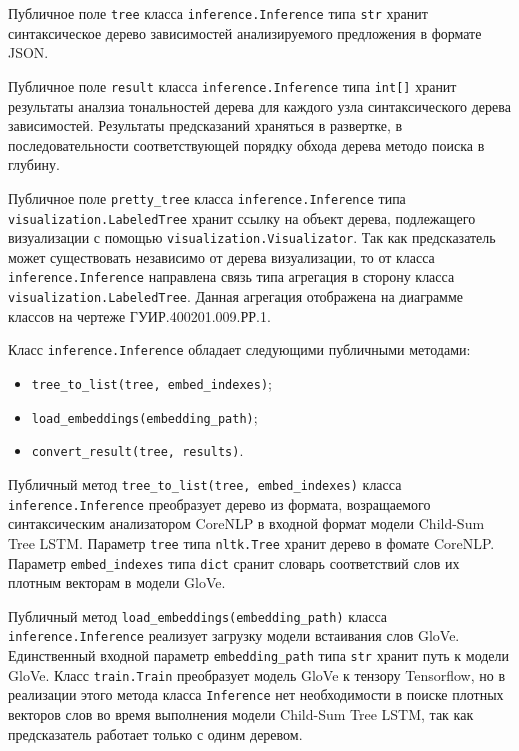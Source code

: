 Публичное поле \texttt{tree} класса \texttt{inference.Inference} типа \texttt{str} хранит синтаксическое дерево зависимостей анализируемого предложения в формате JSON\@.

Публичное поле \texttt{result} класса \texttt{inference.Inference} типа \texttt{int[]} хранит результаты аналзиа тональностей дерева для каждого узла синтаксического дерева зависимостей. Результаты предсказаний храняться в развертке, в последовательности соответствующей порядку обхода дерева методо поиска в глубину.

Публичное поле \texttt{pretty\_tree} класса \texttt{inference.Inference} типа \texttt{visu\-alization.LabeledTree} хранит ссылку на объект дерева, подлежащего визуализации с помощью \texttt{visualization.Visualizator}. Так как предсказатель может существовать независимо от дерева визуализации, то от класса \texttt{infer\-ence.Inference} направлена связь типа агрегация в сторону класса \texttt{visuali\-zation.LabeledTree}. Данная агрегация отображена на диаграмме классов на чертеже ГУИР.400201.009.РР.1.

Класс \texttt{inference.Inference} обладает следующими публичными методами:
\begin{itemize}
\item \texttt{tree\_to\_list(tree, embed\_indexes)};
\item \texttt{load\_embeddings(embedding\_path)};
\item \texttt{convert\_result(tree, results)}.
\end{itemize}

Публичный метод \texttt{tree\_to\_list(tree, embed\_indexes)} класса \texttt{infe\-rence.Inference} преобразует дерево из формата, возращаемого синтаксическим анализатором CoreNLP в входной формат модели Child-Sum Tree LSTM\@. Параметр \texttt{tree} типа \texttt{nltk.Tree} хранит дерево в фомате CoreNLP\@. Параметр \texttt{embed\_indexes} типа \texttt{dict} сранит словарь соответствий слов их плотным векторам в модели GloVe.

Публичный метод \texttt{load\_embeddings(embedding\_path)} класса \texttt{infere\-nce.Inference} реализует загрузку модели встаивания слов GloVe. Единств\-енный входной параметр \texttt{embedding\_path} типа \texttt{str} хранит путь к модели GloVe. Класс \texttt{train.Train} преобразует модель GloVe к тензору Tensorflow, но в реализации этого метода класса \texttt{Inference} нет необходимости в поиске плотных векторов слов во время выполнения модели Child-Sum Tree LSTM, так как предсказатель работает только с одинм деревом.

